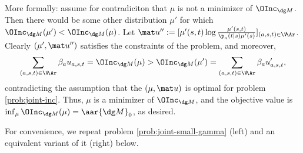 \begin{lproof}
    More formally: assume for contradiciton that $\mu$ is not a minimizer of $\OInc_{\dg M}$. Then there would be some other distribution $\mu'$ for which $\OInc_{\dg M}(\mu') < \OInc_{\dg M}(\mu)$. 
    Let $\mat u'' := [ \mu'(s,t) \log \frac{\mu'(s,t)}{\p_a(t|s) \mu'(s)} ]_{(a,s,t) \in \V\!\Ar}$. Clearly $(\mu', \mat u'')$ satisfies the constraints of the problem, and moreover,
    \[
        \sum_{(a,s,t)\in \V\!\Ar} \beta_a u_{a,s,t} =
        \OInc_{\dg M}(\mu) >
        \OInc_{\dg M}(\mu') =            
        \sum_{(a,s,t)\in \V\!\Ar} \beta_a u'_{a,s,t},
    \]
    contradicting the assumption that the $(\mu, \mat u)$ is optimal for problem \eqref{prob:joint-inc}. Thus, $\mu$ is a minimizer of $\OInc_{\dg M}$, and the objective value is $\inf_{\mu} \OInc_{\dg M}(\mu) = \aar{\dg M}_0$, as desired.  
\end{lproof}

For convenience, we repeat problem \eqref{prob:joint-small-gamma}
(left) and an equivalent variant of it (right) below.

